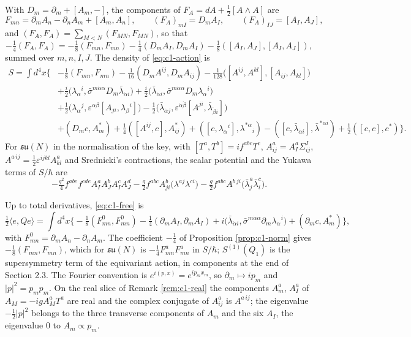 \begin{remark}
With $D_m=\partial_m+[A_m,-]$, the components of $F_A=dA+\tfrac12[A\wedge A]$ are
\[
F_{mn}=\partial_mA_n-\partial_nA_m+[A_m,A_n],\qquad (F_A)_{mI}=D_mA_I,\qquad (F_A)_{IJ}=[A_I,A_J],
\]
and $(F_A,F_A)=\sum_{M<N}(F_{MN},F_{MN})$, so that
\[
-\tfrac14(F_A,F_A)=-\tfrac18(F_{mn},F_{mn})-\tfrac14(D_mA_I,D_mA_I)-\tfrac18([A_I,A_J],[A_I,A_J]),
\]
summed over $m,n,I,J$. The density of \eqref{eq:c1-action} is
\[
\begin{aligned}
S=\int d^4x\Big\{&-\tfrac18(F_{mn},F_{mn})-\tfrac1{16}(D_mA^{ij},D_mA_{ij})-\tfrac1{128}\big([A^{ij},A^{kl}],[A_{ij},A_{kl}]\big)\\
&+\tfrac i2\big(\lambda_\alpha{}^i,\bar\sigma^{m\dot\alpha\alpha}D_m\bar\lambda_{\dot\alpha i}\big)+\tfrac i2\big(\bar\lambda_{\dot\alpha i},\bar\sigma^{m\dot\alpha\alpha}D_m\lambda_\alpha{}^i\big)\\
&+\tfrac12\big(\lambda_\alpha{}^j,\varepsilon^{\alpha\beta}[A_{ji},\lambda_\beta{}^i]\big)-\tfrac12\big(\bar\lambda_{\dot\alpha j},\varepsilon^{\dot\alpha\dot\beta}[A^{ji},\bar\lambda_{\dot\beta i}]\big)\\
&+(D_mc,A^*_m)+\tfrac14([A^{ij},c],A^*_{ij})+([c,\lambda_\alpha{}^i],\lambda^{*\alpha}{}_i)-([c,\bar\lambda_{\dot\alpha i}],\bar\lambda^{*\dot\alpha i})+\tfrac12([c,c],c^*)\Big\}.
\end{aligned}
\]
For $\mathfrak{su}(N)$ in the normalisation of the key, with $[T^a,T^b]=if^{abc}T^c$, $A^a_{ij}=A^a_I\Sigma^I_{ij}$, $A^{a\,ij}=\tfrac12\varepsilon^{ijkl}A^a_{kl}$ and Srednicki's contractions, the scalar potential and the Yukawa terms of $S/\hbar$ are
\[
-\tfrac{g^2}4f^{abe}f^{cde}A^a_IA^b_JA^c_IA^d_J-\tfrac g2f^{abc}A^b_{ji}\big(\lambda^{aj}\lambda^{ci}\big)-\tfrac g2f^{abc}A^{b\,ji}\big(\bar\lambda^a_j\bar\lambda^c_i\big).
\]
\end{remark}

\begin{remark}
Up to total derivatives, \eqref{eq:c1-free} is
\[
\tfrac12\langle e,Qe\rangle=\int d^4x\Big\{-\tfrac18(F^0_{mn},F^0_{mn})-\tfrac14(\partial_mA_I,\partial_mA_I)+i\big(\bar\lambda_{\dot\alpha i},\bar\sigma^{m\dot\alpha\alpha}\partial_m\lambda_\alpha{}^i\big)+(\partial_mc,A^*_m)\Big\},
\]
with $F^0_{mn}=\partial_mA_n-\partial_nA_m$.
The coefficient $-\tfrac14$ of Proposition \ref{prop:c1-norm} gives $-\tfrac18(F_{mn},F_{mn})$, which for $\mathfrak{su}(N)$ is $-\tfrac14F^a_{mn}F^a_{mn}$ in $S/\hbar$; $S^{(1)}(Q_1)$ is the supersymmetry term of the equivariant action, in components at the end of Section 2.3. The Fourier convention is $e^{i(p,x)}=e^{ip_mx_m}$, so $\partial_m\mapsto ip_m$ and $|p|^2=p_mp_m$. On the real slice of Remark \ref{rem:c1-real} the components $A^a_m$, $A^a_I$ of $A_M=-igA^a_MT^a$ are real and the complex conjugate of $A^a_{ij}$ is $A^{a\,ij}$; the eigenvalue $-\tfrac12|p|^2$ belongs to the three transverse components of $A_m$ and the six $A_I$, the eigenvalue $0$ to $A_m\propto p_m$.
\end{remark}

